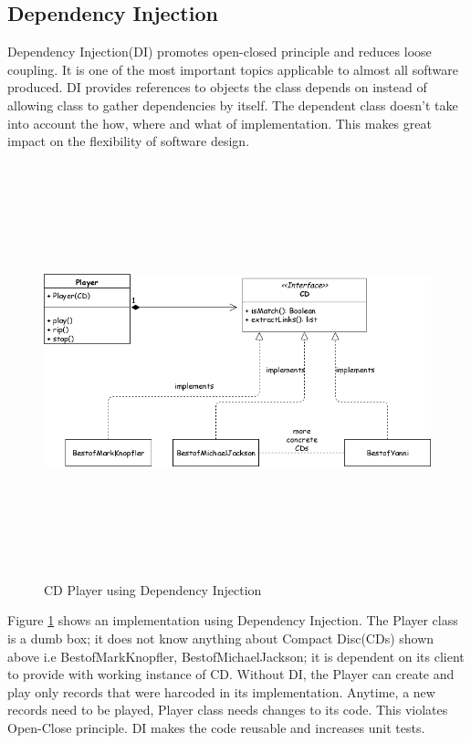 \pagebreak

\subsection{Dependency Injection}
Dependency Injection(DI) promotes open-closed principle and reduces loose coupling. It is one of the most
important topics applicable to almost all software produced. DI provides references to objects the class
depends on instead of allowing class to gather dependencies by itself. The dependent class doesn't
take into account the how, where and what of implementation. This makes great impact on the flexibility of
software design.
\begin{figure}[h!]
  \centering
  \includegraphics[width=15cm,height=12cm,keepaspectratio]{../media/crawler/dinjection.png}
  \caption{CD Player using Dependency Injection}
  \label{fig:dinjection}
\end{figure}

\noindent
Figure \ref{fig:dinjection} shows an implementation using Dependency Injection. The Player class is a dumb box; it does not know anything about Compact Disc(CDs) shown above i.e BestofMarkKnopfler, BestofMichaelJackson; it is dependent on its client to provide with working instance of CD. Without DI, the Player can
create and play only records that were harcoded in its implementation. Anytime, a new records need to be
played, Player class needs changes to its code. This violates Open-Close principle. DI makes the code
reusable and increases unit tests.

